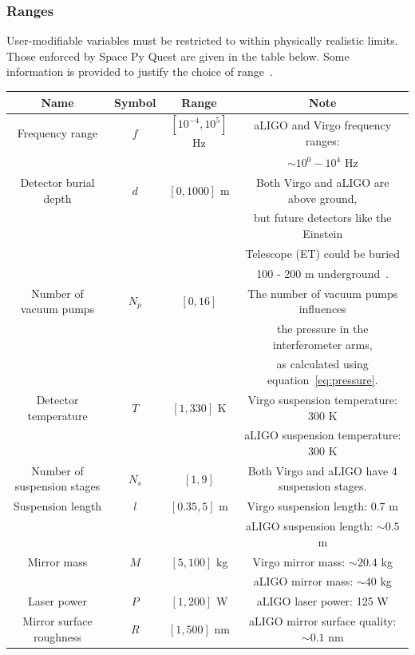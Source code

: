 \documentclass{article}
\begin{document}
\begin{appendix}
\subsubsection*{Ranges}
\label{sec:ranges}
User-modifiable variables must be restricted to within physically
realistic limits. Those enforced by Space Py Quest are given in the
table below. Some information is provided to justify the choice of
range~\cite{advLIGO, Virgo-sens}.
\begin{center}
    \begin{tabular}{ |c|c|c|c| } 
     \hline
     \textbf{Name} & \textbf{Symbol}  & \textbf{Range} & \textbf{Note}\\     
     \hline
     Frequency range  & $f$ & $[10^{-4}, 10^5]$ Hz & aLIGO and Virgo frequency ranges: \\ 
     &  &  &  $\sim 10^0 - 10^4$ Hz\\
     \hline
     Detector burial depth & $d$ & $[0, 1000]$ m & Both Virgo and aLIGO are above ground, \\
     & & & but future detectors like the Einstein \\
     & & & Telescope (ET) could be buried \\ 
     & & & 100 - 200 m underground~\cite{ET}.\\ 
     \hline
     Number of vacuum pumps & $N_p$ & $[0, 16]$ &
            The number of vacuum pumps influences \\
     & & &  the pressure in the interferometer arms, \\
     & & & as calculated using equation~\ref{eq:pressure}.\\ 
     \hline
     Detector temperature & $T$ & $[1, 330]$ K &
            Virgo suspension temperature: 300 K\\
     & & & aLIGO suspension temperature: 300 K\\ 
     \hline
     Number of suspension stages & $N_s$ & $[1, 9]$ & 
            Both Virgo and aLIGO have 4 suspension stages.\\ 
     \hline
    Suspension length & $l$ & $[0.35, 5]$ m &
            Virgo suspension length: 0.7 m \\
    & & & aLIGO suspension length: $\sim 0.5$ m\\ 
    \hline
    Mirror mass& $M$ & $[5, 100]$ kg &
            Virgo mirror mass: $\sim 20.4$ kg\\
    & & & aLIGO mirror mass: $\sim 40$ kg\\ 
    \hline
    Laser power & $P$ & $[1, 200]$ W &
            aLIGO laser power: 125 W\\ 
    \hline
    Mirror surface roughness& $R$ & $[1, 500]$ nm &
            aLIGO mirror surface quality: $\sim 0.1$ nm\\ 
    \hline
    \end{tabular}
\end{center}


\end{appendix}
\end{document}
